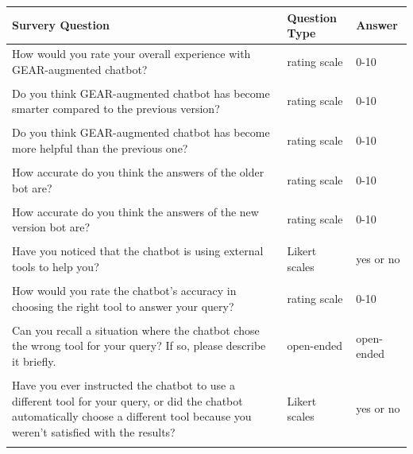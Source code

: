 \documentclass[11pt]{article}
\newcommand{\name}{{\fontfamily{cmss}\selectfont GEAR}}
\begin{document}
\begin{table}[t]
\small
\centering
\begin{tabular}{p{}p{}p{}}
\toprule
Survery Question                                                                     & Question Type & Answer \\ \midrule
How would you rate your overall experience with \name{}-augmented chatbot?   & rating scale  & 0-10   \\&&\\
Do you think \name{}-augmented chatbot has become smarter compared to the previous version? &  rating scale             &  0-10      \\&&\\
Do you think \name{}-augmented chatbot has become more helpful than the previous one?               &   rating scale            &  0-10      \\&&\\
How accurate do you think the answers of the older bot are?                                                                           &       rating scale            &  0-10      \\&&\\
How accurate do you think the answers of the new version bot are?                                                                            &          rating scale            &  0-10   \\&&\\
Have you noticed that the chatbot is using external tools to help you?    & Likert scales             & yes or no       \\&&\\
How would you rate the chatbot's accuracy in choosing the right tool to answer your query?
                                                                            &  rating scale             &  0-10      \\&&\\
Can you recall a situation where the chatbot chose the wrong tool for your query? If so, please describe it briefly.
                                                                            &   open-ended            &   open-ended    \\ &&\\
Have you ever instructed the chatbot to use a different tool for your query, or did the chatbot automatically choose a different tool because you weren't satisfied with the results? &  Likert scales & yes or no \\&&\\

\end{tabular}
\end{table}
\end{document}

